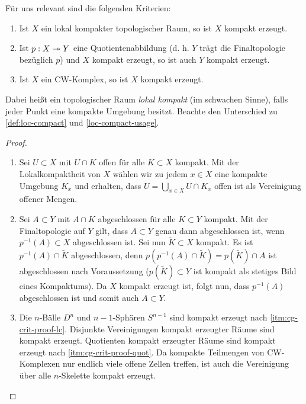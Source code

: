 Für uns relevant sind die folgenden Kriterien:
\begin{lemma} \label{cg-crit}
  \begin{enumerate}[label=(\roman*)]
    \item \label{itm:cg-crit-lc} Ist $X$ ein lokal kompakter
      topologischer Raum, so ist $X$ kompakt erzeugt.
    \item \label{itm:cg-crit-quot} Ist $p: X \twoheadrightarrow Y$ eine
      Quotientenabbildung (d. h. $Y$ trägt die Finaltopologie
      bezüglich $p$) und $X$ kompakt erzeugt, so ist auch $Y$ kompakt
      erzeugt.
     \item \label{itm:cg-crit-cw} Ist $X$ ein CW-Komplex, so ist $X$
       kompakt erzeugt.
  \end{enumerate}
\end{lemma}
Dabei heißt ein topologischer Raum \emph{lokal kompakt} (im schwachen
Sinne), falls jeder Punkt eine kompakte Umgebung besitzt. Beachte den
Unterschied zu \ref{def:loc-compact} und \ref{loc-compact-usage}.
\begin{proof}
  \begin{enumerate}[label=(\roman*)]
    \item \label{itm:cg-crit-proof-lc} Sei $U \subset X$ mit $U \cap
      K$ offen für alle $K \subset X$ kompakt. Mit der
      Lokalkompaktheit von $X$ wählen wir zu jedem $x \in X$ eine
      kompakte Umgebung $K_x$ und erhalten, dass $U = \bigcup_{x \in
        X} U \cap K_x$ offen ist als Vereinigung offener Mengen.
    \item \label{itm:cg-crit-proof-quot} Sei $A \subset Y$ mit $A \cap
      K$ abgeschlossen für alle $K \subset Y$ kompakt. Mit der
      Finaltopologie auf $Y$ gilt, dass $A \subset Y$ genau dann
      abgeschlossen ist, wenn $p^{-1}(A) \subset X$ abgeschlossen
      ist. Sei nun $\tilde{K} \subset X$ kompakt. Es ist $p^{-1}(A)
      \cap \tilde{K}$ abgeschlossen, denn $p(p^{-1}(A) \cap \tilde{K})
      = p(\tilde{K}) \cap A$ ist abgeschlossen nach Voraussetzung
      ($p(\tilde{K}) \subset Y$ ist kompakt als stetiges Bild eines
      Kompaktums). Da $X$ kompakt erzeugt ist, folgt nun, dass
      $p^{-1}(A)$ abgeschlossen ist und somit auch $A \subset Y$.
    \item Die $n$-Bälle $D^n$ und $n-1$-Sphären $S^{n-1}$ sind kompakt
      erzeugt nach \ref{itm:cg-crit-proof-lc}. Disjunkte Vereinigungen
      kompakt erzeugter Räume sind kompakt erzeugt. Quotienten kompakt
      erzeugter Räume sind kompakt erzeugt nach
      \ref{itm:cg-crit-proof-quot}. Da kompakte Teilmengen von
      CW-Komplexen nur endlich viele offene Zellen treffen, ist auch
      die Vereinigung über alle $n$-Skelette kompakt erzeugt.
  \end{enumerate}
\end{proof}

